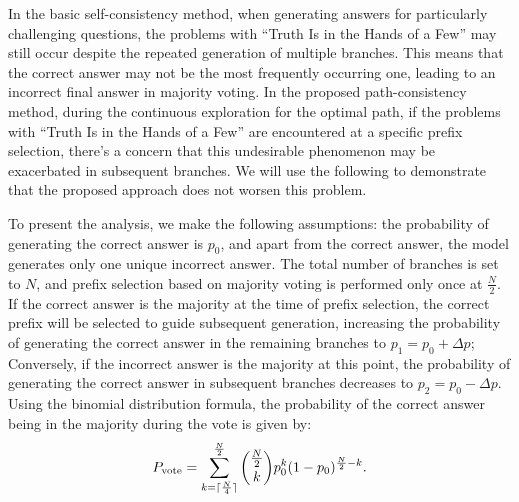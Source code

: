 In the basic self-consistency method, when generating answers for particularly challenging questions, the problems with ``Truth Is in the Hands of a Few'' may still occur despite the repeated generation of multiple branches. This means that the correct answer may not be the most frequently occurring one, leading to an incorrect final answer in majority voting. In the proposed path-consistency method, during the continuous exploration for the optimal path, if the problems with ``Truth Is in the Hands of a Few'' are encountered at a specific prefix selection, there's a concern that this undesirable phenomenon may be exacerbated in subsequent branches. We will use the following to demonstrate that the proposed approach does not worsen this problem. 

To present the analysis, we make the following assumptions: the probability of generating the correct answer is $p_0$, and apart from the correct answer, the model generates only one unique incorrect answer. The total number of branches is set to $N$, and prefix selection based on majority voting is performed only once at $\frac{N}{2}$. %
If the correct answer is the majority at the time of prefix selection, the correct prefix will be selected to guide subsequent generation, increasing the probability of generating the correct answer in the remaining branches to $p_1 = p_0 + \Delta p$; Conversely, if the incorrect answer is the majority at this point, the probability of generating the correct answer in subsequent branches decreases to $p_2 = p_0 - \Delta p$. Using the binomial distribution formula, the probability of the correct answer being in the majority during the vote is given by:
\begin{equation}
    \small
    P_{\text{vote}}=\sum_{k=\lceil\frac{N}{4}\rceil}^{\frac{N}{2}}\binom{\frac{N}{2}}{k}p_0^k(1-p_0)^{\frac{N}{2}-k}.
\end{equation}

